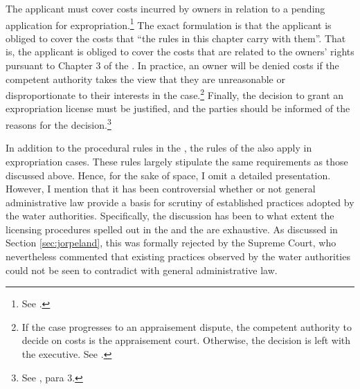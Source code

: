 The applicant must cover costs incurred by owners in relation to a pending application for expropriation.\footnote{See \cite[15]{ea59}.} The exact formulation is that the applicant is obliged to cover the costs that ``the rules in this chapter carry with them''. That is, the applicant is obliged to cover the costs that are related to the owners' rights pursuant to Chapter 3 of the \cite{ea59}. In practice, an owner will be denied costs if the competent authority takes the view that they are unreasonable or disproportionate to their interests in the case.\footnote{If the case progresses to an appraisement dispute, the competent authority to decide on costs is the appraisement court. Otherwise, the decision is left with the executive. See \cite[15]{ea59}.} Finally, the decision to grant an expropriation license must be justified, and the parties should be informed of the reasons for the decision.\footnote{See \cite[12]{ea59}, para 3.}


In addition to the procedural rules in the \cite{ea59}, the rules of the \cite{paa67} also apply in expropriation cases. These rules largely stipulate the same requirements as those discussed above. Hence, for the sake of space, I omit a detailed presentation. However, I mention that it has been controversial whether or not general administrative law provide a basis for scrutiny of established practices adopted by the water authorities. Specifically, the discussion has been to what extent the licensing procedures spelled out in the \cite{wra00} and the \cite{wra17} are exhaustive. As discussed in Section \ref{sec:jorpeland}, this was formally rejected by the Supreme Court, who nevertheless commented that existing practices observed by the water authorities could not be seen to contradict with general administrative law.

